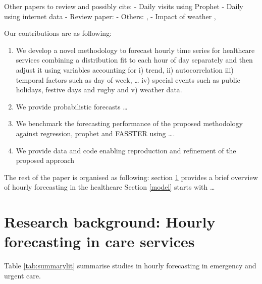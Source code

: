 \documentclass[]{elsarticle} %
\providecommand{\tightlist}{%
  \setlength{\itemsep}{0pt}\setlength{\parskip}{0pt}}
\begin{document}
Other papers to review and possibly cite:
- Daily visits using Prophet \citet{park2019144}
- Daily using internet data \citet{ekstrom2015forecasting}
- Review paper: \citet{wargon2009systematic}
- Others: \citet{boyle2012predicting},
- Impact of weather \citet{parsons2011modelling}, \citet{macgregor2003effect}

Our contributions are as following:

\begin{enumerate}
\def\labelenumi{\arabic{enumi}.}
\tightlist
\item
  We develop a novel methodology to forecast hourly time series for healthcare services combining a distribution fit to each hour of day separately and then adjust it using variables accounting for i) trend, ii) autocorrelation iii) temporal factors such as day of week, \ldots{} iv) special events such as public holidays, festive days and rugby and v) weather data.
\item
  We provide probabilistic forecasts \ldots{}
\item
  We benchmark the forecasting performance of the proposed methodology against regression, prophet and FASSTER using \ldots.
\item
  We provide data and code enabling reproduction and refinement of the proposed approach
\end{enumerate}

The rest of the paper is organised as following: section \ref{lit} provides a brief overview of hourly forecasting in the healthcare Section \ref{model} starts with \ldots{}

\hypertarget{lit}{%
\section{Research background: Hourly forecasting in care services}\label{lit}}

Table \ref{tab:summarylit} summarise studies in hourly forecasting in emergency and urgent care.
\end{document}
